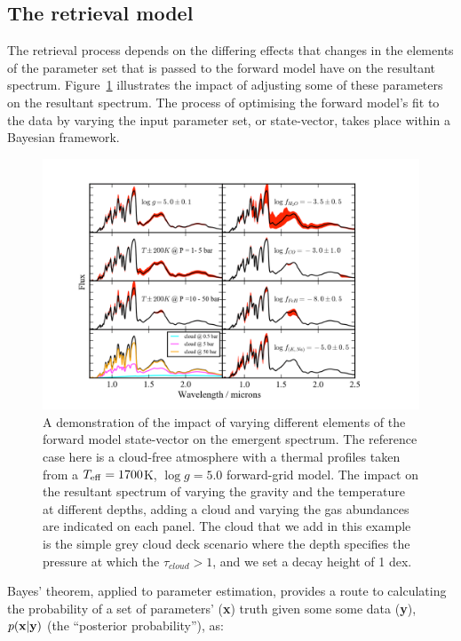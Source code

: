 \documentclass[useAMS,usenatbib]{mn2e}
\begin{document}
\subsection{The retrieval model}
\label{subsec:retrieval}

The retrieval process depends on the differing effects that changes in the elements of the parameter set that is passed to the forward model have on the resultant spectrum. Figure~\ref{fig:influence} illustrates the impact of adjusting some of these parameters on the resultant spectrum. The process of optimising the forward model's fit to the data by varying the input parameter set, or state-vector, takes place within a Bayesian framework.


\begin{figure}
\hspace{-0.8cm}
\includegraphics[width=550pt]{influence.png}
\caption{A demonstration of the impact of varying different elements of the forward model state-vector on the emergent spectrum. The reference case here is a cloud-free atmosphere with a thermal profiles taken from a $T_{\rm eff} = 1700$K, $\log g = 5.0$ \citet{saumon2012} forward-grid model. The impact on the resultant spectrum of varying the gravity and the temperature at different depths, adding a cloud and varying the gas abundances are indicated on each panel.  The cloud that we add in this example is the simple grey cloud deck scenario where the depth specifies the pressure at which the $\tau_{cloud} > 1$, and we set a decay height of 1 dex.
\label{fig:influence}}
\end{figure}


Bayes' theorem, applied to parameter estimation, provides a route to calculating the probability of a set of parameters' ({\bf x}) truth given some some data ({\bf y}), $p({\bf x} | {\bf y})$ (the ``posterior probability''), as:\\
\end{document}
